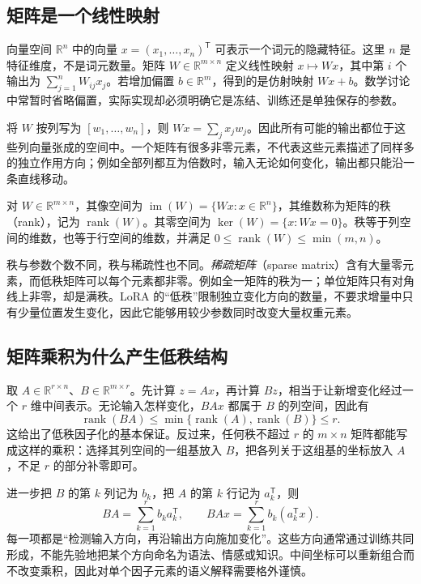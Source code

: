 \documentclass[UTF8,12pt,a4paper,fontset=fandol]{ctexart}
\begin{document}
\subsection{矩阵是一个线性映射}

向量空间 $\mathbb R^n$ 中的向量 $x=(x_1,\ldots,x_n)^{\mathsf T}$ 可表示一个词元的隐藏特征。这里 $n$ 是特征维度，不是词元数量。矩阵 $W\in\mathbb R^{m\times n}$ 定义线性映射 $x\mapsto Wx$，其中第 $i$ 个输出为 $\sum_{j=1}^{n}W_{ij}x_j$。若增加偏置 $b\in\mathbb R^m$，得到的是仿射映射 $Wx+b$。数学讨论中常暂时省略偏置，实际实现却必须明确它是冻结、训练还是单独保存的参数。

将 $W$ 按列写为 $[w_1,\ldots,w_n]$，则 $Wx=\sum_jx_jw_j$。因此所有可能的输出都位于这些列向量张成的空间中。一个矩阵有很多非零元素，不代表这些元素描述了同样多的独立作用方向；例如全部列都互为倍数时，输入无论如何变化，输出都只能沿一条直线移动。

\begin{definition}[秩、像空间与零空间]
对 $W\in\mathbb R^{m\times n}$，其像空间为
$\operatorname{im}(W)=\{Wx:x\in\mathbb R^n\}$，其维数称为矩阵的秩（rank），记为 $\operatorname{rank}(W)$。其零空间为
$\ker(W)=\{x:Wx=0\}$。秩等于列空间的维数，也等于行空间的维数，并满足
$0\leq\operatorname{rank}(W)\leq\min(m,n)$。
\end{definition}

秩与参数个数不同，秩与稀疏性也不同。\emph{稀疏矩阵}（sparse matrix）含有大量零元素，而低秩矩阵可以每个元素都非零。例如全一矩阵的秩为一；单位矩阵只有对角线上非零，却是满秩。LoRA 的“低秩”限制独立变化方向的数量，不要求增量中只有少量位置发生变化，因此它能够用较少参数同时改变大量权重元素。

\subsection{矩阵乘积为什么产生低秩结构}

取 $A\in\mathbb R^{r\times n}$、$B\in\mathbb R^{m\times r}$。先计算 $z=Ax$，再计算 $Bz$，相当于让新增变化经过一个 $r$ 维中间表示。无论输入怎样变化，$BAx$ 都属于 $B$ 的列空间，因此有
\begin{equation}
\operatorname{rank}(BA)\leq
\min\{\operatorname{rank}(A),\operatorname{rank}(B)\}\leq r.
\label{eq:rank-product}
\end{equation}
这给出了低秩因子化的基本保证。反过来，任何秩不超过 $r$ 的 $m\times n$ 矩阵都能写成这样的乘积：选择其列空间的一组基放入 $B$，把各列关于这组基的坐标放入 $A$，不足 $r$ 的部分补零即可。

进一步把 $B$ 的第 $k$ 列记为 $b_k$，把 $A$ 的第 $k$ 行记为 $a_k^{\mathsf T}$，则
\begin{equation}
BA=\sum_{k=1}^{r}b_ka_k^{\mathsf T},
\qquad
BAx=\sum_{k=1}^{r}b_k(a_k^{\mathsf T}x).
\label{eq:outer-product}
\end{equation}
每一项都是“检测输入方向，再沿输出方向施加变化”。这些方向通常通过训练共同形成，不能先验地把某个方向命名为语法、情感或知识。中间坐标可以重新组合而不改变乘积，因此对单个因子元素的语义解释需要格外谨慎。
\end{document}
